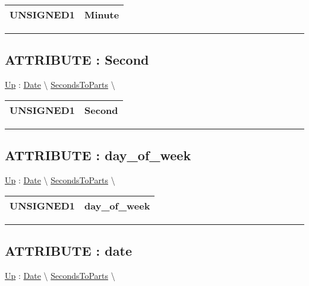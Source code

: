 {\renewcommand{\arraystretch}{1.5}
\begin{tabularx}{\textwidth}{|>{\raggedright\arraybackslash}l|X|}
\hline
\hspace{0pt}UNSIGNED1 & Minute \\
\hline
\end{tabularx}
}

\par


\rule{\linewidth}{0.5pt}
\subsection*{ATTRIBUTE : Second}
\hypertarget{ecldoc:date.secondstoparts.result.second}{}
\hyperlink{ecldoc:date.secondstoparts}{Up} :
\hspace{0pt} \hyperlink{ecldoc:Date}{Date} \textbackslash 
\hspace{0pt} \hyperlink{ecldoc:date.secondstoparts}{SecondsToParts} \textbackslash 

{\renewcommand{\arraystretch}{1.5}
\begin{tabularx}{\textwidth}{|>{\raggedright\arraybackslash}l|X|}
\hline
\hspace{0pt}UNSIGNED1 & Second \\
\hline
\end{tabularx}
}

\par


\rule{\linewidth}{0.5pt}
\subsection*{ATTRIBUTE : day\_of\_week}
\hypertarget{ecldoc:date.secondstoparts.result.day_of_week}{}
\hyperlink{ecldoc:date.secondstoparts}{Up} :
\hspace{0pt} \hyperlink{ecldoc:Date}{Date} \textbackslash 
\hspace{0pt} \hyperlink{ecldoc:date.secondstoparts}{SecondsToParts} \textbackslash 

{\renewcommand{\arraystretch}{1.5}
\begin{tabularx}{\textwidth}{|>{\raggedright\arraybackslash}l|X|}
\hline
\hspace{0pt}UNSIGNED1 & day\_of\_week \\
\hline
\end{tabularx}
}

\par


\rule{\linewidth}{0.5pt}
\subsection*{ATTRIBUTE : date}
\hypertarget{ecldoc:date.secondstoparts.result.date}{}
\hyperlink{ecldoc:date.secondstoparts}{Up} :
\hspace{0pt} \hyperlink{ecldoc:Date}{Date} \textbackslash 
\hspace{0pt} \hyperlink{ecldoc:date.secondstoparts}{SecondsToParts} \textbackslash 

